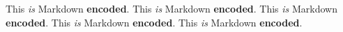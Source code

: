 
\def\mytitle{Markdown in HTML Test}
\def\latexmode{memoir}

This \emph{is} Markdown \textbf{encoded}.
This \emph{is} Markdown \textbf{encoded}.
This \emph{is} Markdown \textbf{encoded}.
This \emph{is} Markdown \textbf{encoded}.
This \emph{is} Markdown \textbf{encoded}.




